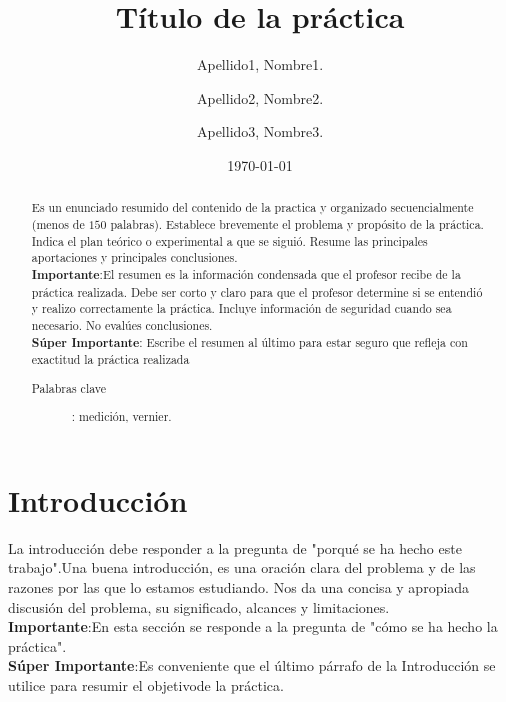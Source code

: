 \documentclass[%
 reprint,
groupedaddress,
unsortedaddress,
 amsmath,amssymb,
 aps,
superscriptaddress
]{revtex4-2}
\begin{document}

\title{T\'itulo de la pr\'actica}%

\author{Apellido1, Nombre1.}

\author{Apellido2, Nombre2.}
\author{Apellido3, Nombre3.}



\date{\today}%

\begin{abstract}
Es un enunciado resumido del  contenido de  la  practica y  organizado secuencialmente  
(menos de $ 150 $ palabras). Establece brevemente el problema y propósito de la práctica. 
Indica el plan teórico o experimental a que se siguió. Resume las principales 
aportaciones y principales conclusiones.\\ \textbf{Importante}:El  resumen  es  la  
información  condensada  que  el  profesor  recibe  de  la  práctica realizada.  Debe  
ser  corto  y  claro  para  que  el  profesor  determine  si  se  entendió  y  realizo 
correctamente  la  práctica.  Incluye  información  de  seguridad  cuando  sea  
necesario.  No  evalúes conclusiones.\\\textbf{Súper  Importante}: Escribe  el  resumen  
al  último  para  estar  seguro  que  refleja  con  exactitud  la práctica realizada
\begin{description}
\item[Palabras clave]: medición, vernier.
\end{description}
\end{abstract}

\maketitle


\section{Introducción}
\label{sec:introduccion}
La  introducción  debe  responder  a  la  pregunta  de  "porqué  se  ha  hecho  este  
trabajo".Una  buena introducción,  es  una  oración  clara  del  problema  y  de  las  
razones  por  las  que  lo  estamos estudiando.  Nos  da  una  concisa  y  apropiada  
discusión  del  problema,  su  significado,  alcances  y 
limitaciones.\\\textbf{Importante}:En esta sección se responde a la pregunta de "cómo se 
ha hecho la práctica".\\\textbf{Súper Importante}:Es conveniente que el último párrafo 
de la Introducción se utilice para resumir el objetivode la práctica.
\end{document}
